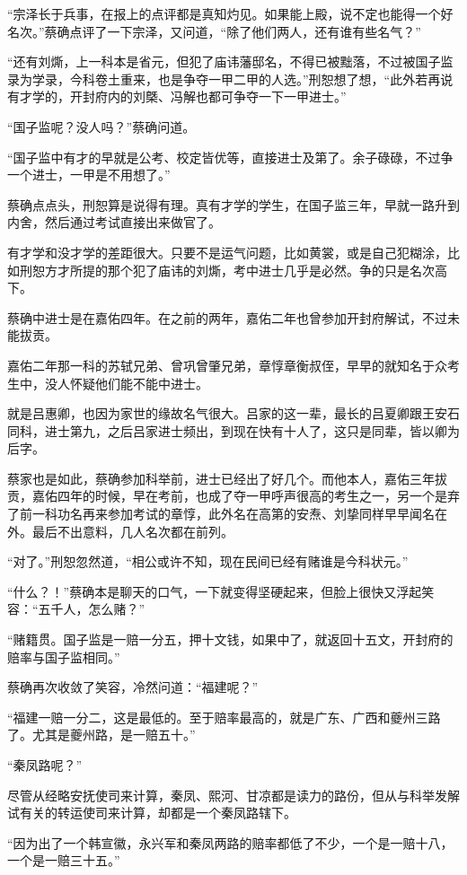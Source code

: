 “宗泽长于兵事，在报上的点评都是真知灼见。如果能上殿，说不定也能得一个好名次。”蔡确点评了一下宗泽，又问道，“除了他们两人，还有谁有些名气？”

“还有刘燍，上一科本是省元，但犯了庙讳藩邸名，不得已被黜落，不过被国子监录为学录，今科卷土重来，也是争夺一甲二甲的人选。”刑恕想了想，“此外若再说有才学的，开封府内的刘槩、冯解也都可争夺一下一甲进士。”

“国子监呢？没人吗？”蔡确问道。

“国子监中有才的早就是公考、校定皆优等，直接进士及第了。余子碌碌，不过争一个进士，一甲是不用想了。”

蔡确点点头，刑恕算是说得有理。真有才学的学生，在国子监三年，早就一路升到内舍，然后通过考试直接出来做官了。

有才学和没才学的差距很大。只要不是运气问题，比如黄裳，或是自己犯糊涂，比如刑恕方才所提的那个犯了庙讳的刘燍，考中进士几乎是必然。争的只是名次高下。

蔡确中进士是在嘉佑四年。在之前的两年，嘉佑二年也曾参加开封府解试，不过未能拔贡。

嘉佑二年那一科的苏轼兄弟、曾巩曾肇兄弟，章惇章衡叔侄，早早的就知名于众考生中，没人怀疑他们能不能中进士。

就是吕惠卿，也因为家世的缘故名气很大。吕家的这一辈，最长的吕夏卿跟王安石同科，进士第九，之后吕家进士频出，到现在快有十人了，这只是同辈，皆以卿为后字。

蔡家也是如此，蔡确参加科举前，进士已经出了好几个。而他本人，嘉佑三年拔贡，嘉佑四年的时候，早在考前，也成了夺一甲呼声很高的考生之一，另一个是弃了前一科功名再来参加考试的章惇，此外名在高第的安焘、刘挚同样早早闻名在外。最后不出意料，几人名次都在前列。

“对了。”刑恕忽然道，“相公或许不知，现在民间已经有赌谁是今科状元。”

“什么？！”蔡确本是聊天的口气，一下就变得坚硬起来，但脸上很快又浮起笑容：“五千人，怎么赌？”

“赌籍贯。国子监是一赔一分五，押十文钱，如果中了，就返回十五文，开封府的赔率与国子监相同。”

蔡确再次收敛了笑容，冷然问道：“福建呢？”

“福建一赔一分二，这是最低的。至于赔率最高的，就是广东、广西和夔州三路了。尤其是夔州路，是一赔五十。”

“秦凤路呢？”

尽管从经略安抚使司来计算，秦凤、熙河、甘凉都是读力的路份，但从与科举发解试有关的转运使司来计算，却都是一个秦凤路辖下。

“因为出了一个韩宣徽，永兴军和秦凤两路的赔率都低了不少，一个是一赔十八，一个是一赔三十五。”

